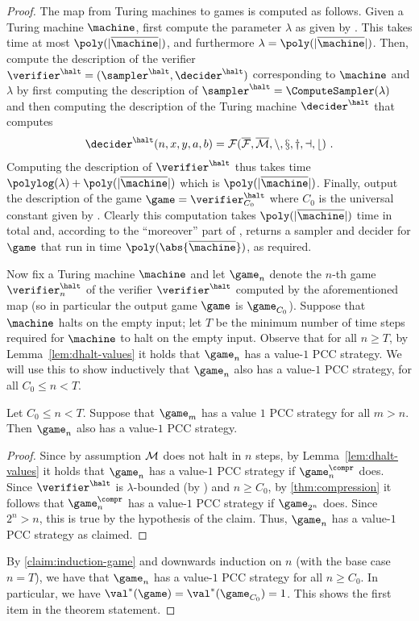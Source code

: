 \begin{proof}
  The map from Turing machines to games is computed as follows. 
  Given a Turing machine $\machine$, first compute the parameter $\lambda$ as given by
  . This takes time at most $\poly(|\overline{\machine}|)$, and furthermore $\lambda = \poly(|\overline{\machine}|)$. 
  Then, compute the description of the verifier $\verifier^\halt = (\sampler^\halt,\decider^\halt)$ corresponding to $\machine$ and $\lambda$ 
  by first computing the description of $\sampler^\halt = \ComputeSampler(\lambda)$ and then computing the description of the Turing machine $\decider^\halt$ that computes
  \[
  	\decider^\halt(n,x,y,a,b) = \cal{F}(\overline{\cal{F}},\overline{\cal{M}},n,x,y,a,b)~.
  \]
  Computing the description of $\verifier^\halt$ thus takes time $\polylog(\lambda) + \poly(|\overline{\machine}|)$ which is $\poly(|\overline{\machine}|)$. Finally,
 	output the description of the game $\game = \verifier^\halt_{C_0}$ where $C_0$ is the universal constant given by . Clearly this computation takes $\poly(|\overline{\machine}|)$ time in total and, according to the ``moreover'' part of , returns a sampler and decider for $\game$ that run in time $\poly(\abs{\overline{\machine}})$, as required. 
  


	Now fix a Turing machine $\machine$ and let $\game_n$ denote the $n$-th game $\verifier^\halt_n$ of the verifier $\verifier^\halt$ computed by the aforementioned map (so in particular the output game $\game$ is $\game_{C_0}$). Suppose that $\machine$ halts on the empty input; let $T$ be the minimum number
  of time steps required for $\machine$ to halt on the empty input.
  Observe that for all $n \geq T$, by Lemma~\ref{lem:dhalt-values} it holds that
  $\game_n$ has a value-$1$ PCC strategy.
  We will use this to show inductively that $\game_n$ also has a value-$1$ PCC
  strategy, for all $ C_0 \leq n < T$.

  \begin{claim}
    Let $ C_0 \leq n < T$. Suppose that $\game_{m}$ has a value $1$ PCC
    strategy for all
    $m > n$. Then $\game_n$ also has a value-$1$ PCC strategy.
    \label{claim:induction-game}
  \end{claim}
  \begin{proof}
    Since by assumption $\cal{M}$ does not halt in $n$ steps, by
    Lemma~\ref{lem:dhalt-values} it holds that $\game_n$ has a value-$1$ PCC
    strategy if $\game^{\compr}_n$ does.
    Since $\verifier^\halt$ is $\lambda$-bounded (by ) and $n \geq C_0$, by
    \cref{thm:compression} it follows that $\game^{\compr}_n$ has a value-$1$ PCC
    strategy if $\game_{2^n}$ does.
    Since $2^n > n$, this is true by the hypothesis of the claim.
    Thus, $\game_n$ has a value-$1$ PCC strategy as claimed.
  \end{proof}
  By \cref{claim:induction-game} and downwards induction on $n$ (with the base
  case $n = T$), we have that $\game_n$ has a value-$1$ PCC strategy for all $n
  \geq C_0$.
  In particular, we have $\val^*(\game) = \val^*(\game_{C_0}) = 1$.
  This shows the first item in the theorem statement.


\end{proof}
